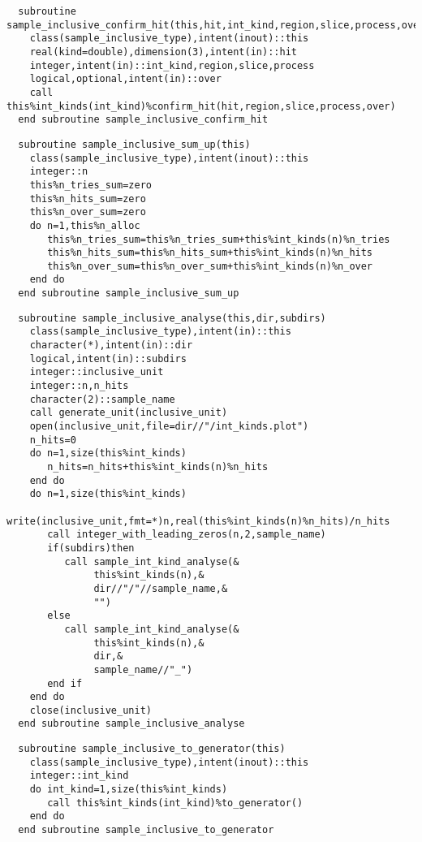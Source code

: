 \begin{Verbatim}
  subroutine sample_inclusive_confirm_hit(this,hit,int_kind,region,slice,process,over)
    class(sample_inclusive_type),intent(inout)::this
    real(kind=double),dimension(3),intent(in)::hit
    integer,intent(in)::int_kind,region,slice,process
    logical,optional,intent(in)::over
    call this%int_kinds(int_kind)%confirm_hit(hit,region,slice,process,over)
  end subroutine sample_inclusive_confirm_hit
\end{Verbatim}
  
\begin{Verbatim}
  subroutine sample_inclusive_sum_up(this)
    class(sample_inclusive_type),intent(inout)::this
    integer::n
    this%n_tries_sum=zero
    this%n_hits_sum=zero
    this%n_over_sum=zero
    do n=1,this%n_alloc
       this%n_tries_sum=this%n_tries_sum+this%int_kinds(n)%n_tries
       this%n_hits_sum=this%n_hits_sum+this%int_kinds(n)%n_hits
       this%n_over_sum=this%n_over_sum+this%int_kinds(n)%n_over
    end do
  end subroutine sample_inclusive_sum_up
\end{Verbatim}

\begin{Verbatim}
  subroutine sample_inclusive_analyse(this,dir,subdirs)
    class(sample_inclusive_type),intent(in)::this
    character(*),intent(in)::dir
    logical,intent(in)::subdirs
    integer::inclusive_unit    
    integer::n,n_hits
    character(2)::sample_name
    call generate_unit(inclusive_unit)
    open(inclusive_unit,file=dir//"/int_kinds.plot")
    n_hits=0
    do n=1,size(this%int_kinds)
       n_hits=n_hits+this%int_kinds(n)%n_hits
    end do
    do n=1,size(this%int_kinds)
       write(inclusive_unit,fmt=*)n,real(this%int_kinds(n)%n_hits)/n_hits
       call integer_with_leading_zeros(n,2,sample_name)
       if(subdirs)then
          call sample_int_kind_analyse(&
               this%int_kinds(n),&
               dir//"/"//sample_name,&
               "")
       else
          call sample_int_kind_analyse(&
               this%int_kinds(n),&
               dir,&
               sample_name//"_")
       end if
    end do
    close(inclusive_unit)
  end subroutine sample_inclusive_analyse
\end{Verbatim}

\begin{Verbatim}
  subroutine sample_inclusive_to_generator(this)
    class(sample_inclusive_type),intent(inout)::this
    integer::int_kind
    do int_kind=1,size(this%int_kinds)
       call this%int_kinds(int_kind)%to_generator()
    end do
  end subroutine sample_inclusive_to_generator
\end{Verbatim}

